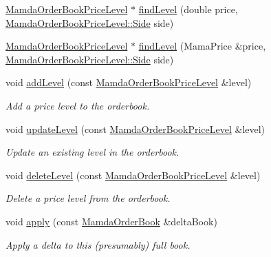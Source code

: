 \begin{CompactItemize}
\item 
\hyperlink{classWombat_1_1MamdaOrderBookPriceLevel}{Mamda\-Order\-Book\-Price\-Level} $\ast$ \hyperlink{classWombat_1_1MamdaOrderBook_430242ac5ee0f6d205db1fcb9e288721}{find\-Level} (double price, \hyperlink{classWombat_1_1MamdaOrderBookPriceLevel_384c34b0a74d874b8969dee9b0d3718d}{Mamda\-Order\-Book\-Price\-Level::Side} side)
\item 
\hyperlink{classWombat_1_1MamdaOrderBookPriceLevel}{Mamda\-Order\-Book\-Price\-Level} $\ast$ \hyperlink{classWombat_1_1MamdaOrderBook_074b3044e7a1bf090ae97b24398aa05d}{find\-Level} (Mama\-Price \&price, \hyperlink{classWombat_1_1MamdaOrderBookPriceLevel_384c34b0a74d874b8969dee9b0d3718d}{Mamda\-Order\-Book\-Price\-Level::Side} side)
\item 
void \hyperlink{classWombat_1_1MamdaOrderBook_8e3034d510345db877f887bcf4e4cc10}{add\-Level} (const \hyperlink{classWombat_1_1MamdaOrderBookPriceLevel}{Mamda\-Order\-Book\-Price\-Level} \&level)
\begin{CompactList}\small\item\em Add a price level to the orderbook. \item\end{CompactList}\item 
void \hyperlink{classWombat_1_1MamdaOrderBook_5dc1e1399aebce581e40c9a3127ca5e5}{update\-Level} (const \hyperlink{classWombat_1_1MamdaOrderBookPriceLevel}{Mamda\-Order\-Book\-Price\-Level} \&level)
\begin{CompactList}\small\item\em Update an existing level in the orderbook. \item\end{CompactList}\item 
void \hyperlink{classWombat_1_1MamdaOrderBook_3e9404b31ed55a5b5b82ac1b0064aacd}{delete\-Level} (const \hyperlink{classWombat_1_1MamdaOrderBookPriceLevel}{Mamda\-Order\-Book\-Price\-Level} \&level)
\begin{CompactList}\small\item\em Delete a price level from the orderbook. \item\end{CompactList}\item 
void \hyperlink{classWombat_1_1MamdaOrderBook_1b56ce5dd8c4bf64c84c93c351a42b3f}{apply} (const \hyperlink{classWombat_1_1MamdaOrderBook}{Mamda\-Order\-Book} \&delta\-Book)
\begin{CompactList}\small\item\em Apply a delta to this (presumably) full book. \item\end{CompactList}\item 

\end{CompactItemize}
